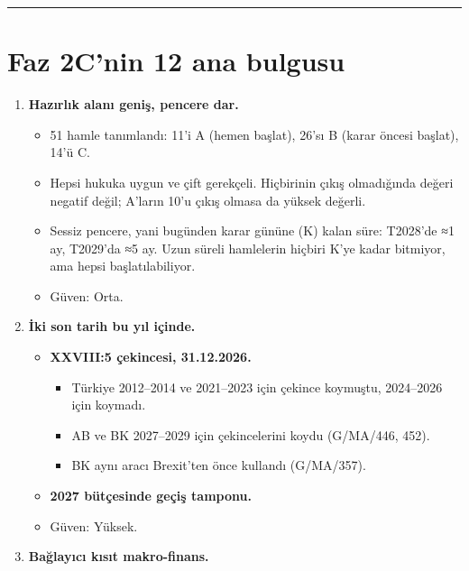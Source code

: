 \begin{center}\rule{0.5\linewidth}{0.5pt}\end{center}

\hypertarget{02c_hazirlik-faz-2cnin-12-ana-bulgusu}{%
\section{Faz 2C'nin 12 ana bulgusu}\label{02c_hazirlik-faz-2cnin-12-ana-bulgusu}}

\begin{enumerate}
\def\labelenumi{\arabic{enumi}.}
\tightlist
\item
  \textbf{Hazırlık alanı geniş, pencere dar.}

  \begin{itemize}
  \tightlist
  \item
    51 hamle tanımlandı: 11'i A (hemen başlat), 26'sı B (karar öncesi başlat), 14'ü C.
  \item
    Hepsi hukuka uygun ve çift gerekçeli. Hiçbirinin çıkış olmadığında değeri negatif değil; A'ların 10'u çıkış olmasa da yüksek değerli.
  \item
    Sessiz pencere, yani bugünden karar gününe (K) kalan süre: T2028'de ≈1 ay, T2029'da ≈5 ay. Uzun süreli hamlelerin hiçbiri K'ye kadar bitmiyor, ama hepsi başlatılabiliyor.
  \item
    \etiketH{} Güven: Orta.
  \end{itemize}
\item
  \textbf{İki son tarih bu yıl içinde.}

  \begin{itemize}
  \tightlist
  \item
    \textbf{XXVIII:5 çekincesi, 31.12.2026.}

    \begin{itemize}
    \tightlist
    \item
      Türkiye 2012--2014 ve 2021--2023 için çekince koymuştu, 2024--2026 için koymadı.
    \item
      AB ve BK 2027--2029 için çekincelerini koydu (G/MA/446, 452).
    \item
      BK aynı aracı Brexit'ten önce kullandı (G/MA/357).
    \end{itemize}
  \item
    \textbf{2027 bütçesinde geçiş tamponu.}
  \item
    \etiketV{} Güven: Yüksek.
  \end{itemize}
\item
  \textbf{Bağlayıcı kısıt makro-finans.}


\end{enumerate}
